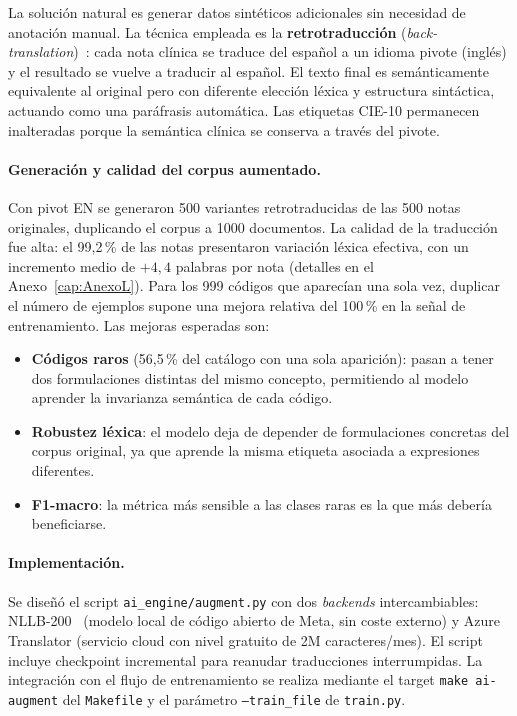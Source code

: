 La solución natural es generar datos sintéticos adicionales sin necesidad de anotación manual. La técnica empleada es la \textbf{retrotraducción} (\emph{back-translation})~\cite{sennrich2016improving}: cada nota clínica se traduce del español a un idioma pivote (inglés) y el resultado se vuelve a traducir al español. El texto final es semánticamente equivalente al original pero con diferente elección léxica y estructura sintáctica, actuando como una paráfrasis automática. Las etiquetas CIE-10 permanecen inalteradas porque la semántica clínica se conserva a través del pivote.

\paragraph{Generación y calidad del corpus aumentado.}
Con pivot EN se generaron 500 variantes retrotraducidas de las 500 notas originales, duplicando el corpus a 1000 documentos. La calidad de la traducción fue alta: el 99,2\,\% de las notas presentaron variación léxica efectiva, con un incremento medio de $+4{,}4$ palabras por nota (detalles en el Anexo~\ref{cap:AnexoL}). Para los 999 códigos que aparecían una sola vez, duplicar el número de ejemplos supone una mejora relativa del 100\,\% en la señal de entrenamiento. Las mejoras esperadas son:

\begin{itemize}
 \item \textbf{Códigos raros} (56,5\,\% del catálogo con una sola aparición): pasan a tener dos formulaciones distintas del mismo concepto, permitiendo al modelo aprender la invarianza semántica de cada código.
 \item \textbf{Robustez léxica}: el modelo deja de depender de formulaciones concretas del corpus original, ya que aprende la misma etiqueta asociada a expresiones diferentes.
 \item \textbf{F1-macro}: la métrica más sensible a las clases raras es la que más debería beneficiarse.
\end{itemize}

\paragraph{Implementación.}
Se diseñó el script \texttt{ai\_engine/augment.py} con dos \emph{backends} intercambiables: NLLB-200~\cite{costa-jussa2022nllb200} (modelo local de código abierto de Meta, sin coste externo) y Azure Translator (servicio cloud con nivel gratuito de 2M caracteres/mes). El script incluye checkpoint incremental para reanudar traducciones interrumpidas. La integración con el flujo de entrenamiento se realiza mediante el target \texttt{make ai-augment} del \texttt{Makefile} y el parámetro \texttt{--train\_file} de \texttt{train.py}.

